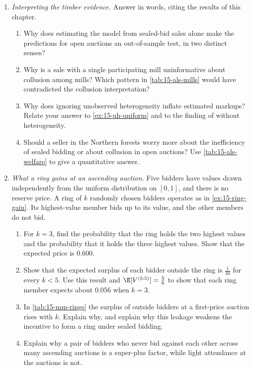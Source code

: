 \begin{enumerate}[label=\arabic*., leftmargin=*, itemsep=6pt]
\item \textit{Interpreting the timber evidence.} Answer in words, citing the results of this chapter.
\begin{enumerate}[label=(\alph*)]
  \item Why does estimating the model from sealed-bid sales alone make the predictions for open auctions an
  out-of-sample test, in two distinct senses?
  \item Why is a sale with a single participating mill uninformative about collusion among mills? Which pattern
  in \cref{tab:15-als-mills} would have contradicted the collusion interpretation?
  \item Why does ignoring unobserved heterogeneity inflate estimated markups? Relate your answer to
  \cref{ex:15-uh-uniform} and to the finding of \citet{AtheyLevinSeira2011} without heterogeneity.
  \item Should a seller in the Northern forests worry more about the inefficiency of sealed bidding or about
  collusion in open auctions? Use \cref{tab:15-als-welfare} to give a quantitative answer.
\end{enumerate}

\item \textit{What a ring gains at an ascending auction.} Five bidders have values drawn independently from the
uniform distribution on $[0,1]$, and there is no reserve price. A ring of $k$ randomly chosen bidders operates
as in \cref{ex:15-ring-gain}. Its highest-value member bids up to its value, and the other members do not bid.
\begin{enumerate}[label=(\alph*)]
  \item For $k=3$, find the probability that the ring holds the two highest values and the probability that it
  holds the three highest values. Show that the expected price is $0.600$.
  \item Show that the expected surplus of each bidder outside the ring is $\frac{1}{30}$ for every $k<5$. Use
  this result and $\E[V^{(5:5)}]=\frac56$ to show that each ring member expects about $0.056$ when $k=3$.
  \item In \cref{tab:15-mm-rings} the surplus of outside bidders at a first-price auction rises with $k$.
  Explain why, and explain why this leakage weakens the incentive to form a ring under sealed bidding.
  \item Explain why a pair of bidders who never bid against each other across many ascending auctions is a
  super-plus factor, while light attendance at the auctions is not.
\end{enumerate}


\end{enumerate}
